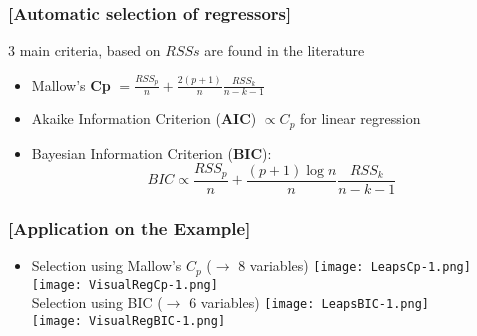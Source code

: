 \documentclass[xcolor=x11names,compress, aspectratio=169]{beamer}
\renewcommand{\(}{\begin{columns}}
\renewcommand{\)}{\end{columns}}
\newcommand{\<}[1]{\begin{column}{#1}}
\renewcommand{\>}{\end{column}}
\begin{document}

\begin{frame} %
\frametitle{\textcolor{brique}{[Automatic selection of regressors]}}
3 main criteria, based on $RSSs$ are found in the literature
\pause
\begin{itemize}[<+->]
  \item Mallow's \textbf{Cp}  $ = \frac{RSS_p}{n}  + \frac{2(p+1)}{n} \frac{RSS_k}{n-k-1} $
  \item Akaike Information Criterion (\textbf{AIC})  $\propto C_p$ for linear regression
  \item Bayesian  Information Criterion (\textbf{BIC}): $$ BIC \propto \frac{RSS_p}{n}  + \frac{(p+1) \log n}{n} \frac{RSS_k}{n-k-1} $$
  
\end{itemize}
\end{frame}

\begin{frame} %
\frametitle{\textcolor{brique}{[Application on the Example]}}
\pause
\begin{itemize}
  \item[]
   {Selection using Mallow's $C_p$ ($\rightarrow $ 8 variables) }
   { \texttt{[image: LeapsCp-1.png]} \\ }
   { \texttt{[image: VisualRegCp-1.png]} \\ }
   {Selection using BIC ($\rightarrow $ 6 variables) }
   { \texttt{[image: LeapsBIC-1.png]} \\ }
   { \texttt{[image: VisualRegBIC-1.png]} \\ }
\end{itemize}
\end{frame}
\end{document}
